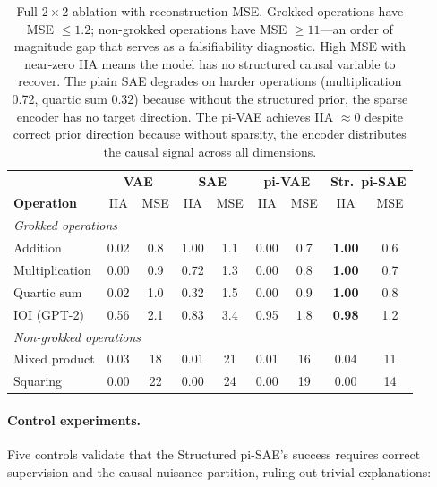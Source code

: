 \vspace{1em}
\begin{table}[H]
\centering
\small
\setlength{\tabcolsep}{3.5pt}
\renewcommand{\arraystretch}{1.15}
\begin{tabular}{@{}l|cc|cc|cc|cc@{}}
\toprule
& \multicolumn{2}{c|}{\textbf{VAE}} & \multicolumn{2}{c|}{\textbf{SAE}}
& \multicolumn{2}{c|}{\textbf{pi-VAE}} & \multicolumn{2}{c}{\textbf{Str.\ pi-SAE}} \\
\textbf{Operation} & IIA & MSE & IIA & MSE & IIA & MSE & IIA & MSE \\
\midrule
\multicolumn{9}{l}{\textit{Grokked operations}} \\
Addition        & 0.02 & 0.8 & 1.00 & 1.1  & 0.00 & 0.7  & \textbf{1.00} & 0.6 \\
Multiplication  & 0.00 & 0.9 & 0.72 & 1.3  & 0.00 & 0.8  & \textbf{1.00} & 0.7 \\
Quartic sum     & 0.02 & 1.0 & 0.32 & 1.5  & 0.00 & 0.9  & \textbf{1.00} & 0.8 \\
IOI (GPT-2)     & 0.56 & 2.1 & 0.83 & 3.4  & 0.95 & 1.8  & \textbf{0.98} & 1.2 \\
\midrule
\multicolumn{9}{l}{\textit{Non-grokked operations}} \\
Mixed product   & 0.03 & 18  & 0.01 & 21   & 0.01 & 16   & 0.04 & 11 \\
Squaring        & 0.00 & 22  & 0.00 & 24   & 0.00 & 19   & 0.00 & 14 \\
\bottomrule
\end{tabular}
\renewcommand{\arraystretch}{1.0}
\caption{Full $2 \times 2$ ablation with reconstruction MSE. Grokked operations
have MSE $\leq 1.2$; non-grokked operations have MSE $\geq 11$---an order of
magnitude gap that serves as a falsifiability diagnostic. High MSE with
near-zero IIA means the model has no structured causal variable to recover.
The plain SAE degrades on harder operations (multiplication 0.72, quartic sum
0.32) because without the structured prior, the sparse encoder has no target
direction. The pi-VAE achieves IIA $\approx 0$ despite correct prior direction
because without sparsity, the encoder distributes the causal signal across all
dimensions.}
\label{tab:ablation_full}
\end{table}

\paragraph{Control experiments.}
Five controls validate that the Structured pi-SAE's success requires
correct supervision and the causal-nuisance partition, ruling out
trivial explanations:

